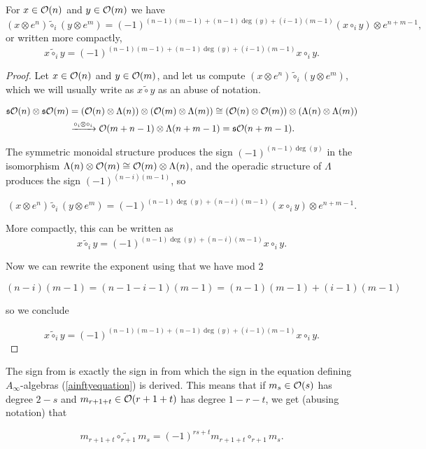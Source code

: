 \documentclass[join.tex]{subfiles}
\begin{document}
\begin{lem}\label{tilde}
For $x\in{\mathcal O}(n)$ and $y\in{\mathcal O}(m)$ we have
\[(x\otimes e^n)\tilde{\circ}_i(y\otimes e^m)=(-1)^{(n-1)(m-1)+(n-1)\deg(y)+(i-1)(m-1)}(x\circ_i y)\otimes e^{n+m-1},\]
or written more compactly,
\[x\tilde{\circ}_iy=(-1)^{(n-1)(m-1)+(n-1)\deg(y)+(i-1)(m-1)}x\circ_i y.\]
\end{lem}
\begin{proof}
Let $x\in{\mathcal O}(n)$ and $y\in{\mathcal O}(m)$, and let us compute $(x\otimes e^n)\tilde{\circ}_i (y\otimes e^m)$, which we will usually write as $x\tilde{\circ}y$ as an abuse of notation.

\begin{align*}
\mathfrak{s}{\mathcal O}(n)\otimes\mathfrak{s}{\mathcal O}(m)&=({\mathcal O}(n)\otimes\Lambda(n))\otimes ({\mathcal O}(m)\otimes\Lambda(m))\cong ({\mathcal O}(n)\otimes {\mathcal O}(m))\otimes (\Lambda(n)\otimes \Lambda(m))\\
&\xrightarrow{\circ_i\otimes\circ_i} {\mathcal O}(m+n-1)\otimes \Lambda(n+m-1)=\mathfrak{s}{\mathcal O}(n+m-1).
\end{align*}

The symmetric monoidal structure produces the sign $(-1)^{(n-1)\deg(y)}$ in the isomorphism $\Lambda(n)\otimes {\mathcal O}(m)\cong{\mathcal O}(m)\otimes\Lambda(n)$, and the operadic structure of $\Lambda$ produces the sign $(-1)^{(n-i)(m-1)}$, so 

\[(x\otimes e^n)\tilde{\circ}_i(y\otimes e^m)=(-1)^{(n-1)\deg(y)+(n-i)(m-1)}(x\circ_i y)\otimes e^{n+m-1}.\]

More compactly, this can be written as
\begin{equation}\label{tildecircle}
x\tilde{\circ}_iy=(-1)^{(n-1)\deg(y)+(n-i)(m-1)}x\circ_i y.
\end{equation}

Now we can rewrite the exponent using that we have mod 2

\[(n-i)(m-1)=(n-1-i-1)(m-1)=(n-1)(m-1)+(i-1)(m-1)\]

so we conclude 

\[x\tilde{\circ}_iy=(-1)^{(n-1)(m-1)+(n-1)\deg(y)+(i-1)(m-1)}x\circ_i y.\]
\end{proof}

\begin{remark}
The sign from  is exactly the sign in \cite{RW} from which the sign in the equation defining $A_\infty$-algebras (\cref{ainftyequation}) is derived. This means that if $m_s\in{\mathcal O}(s)$ has degree $2-s$ and $m_{r+1+t}\in {\mathcal O}(r+1+t)$ has degree $1-r-t$, we get (abusing notation) that

\[m_{r+1+t}\tilde{\circ_{r+1}}m_s=(-1)^{rs+t}m_{r+1+t}\circ_{r+1}m_s.\]
\end{remark}
\end{document}
